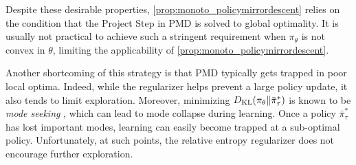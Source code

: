 Despite these desirable properties, 
\cref{prop:monoto_policymirrordescent}
relies on the condition that the Project Step in PMD is solved to
global optimality.
It is usually not practical to achieve such a stringent requirement
when $\pi_\theta$ is not convex in $\theta$,
limiting the applicability of \cref{prop:monoto_policymirrordescent}.

Another shortcoming of this strategy is 
that PMD typically gets trapped in poor local optima.
Indeed, while the regularizer helps prevent
a large policy update, it also tends to limit exploration.
Moreover, minimizing 
$D_{\mathrm{KL}}(\pi_\theta \| \bar{\pi}_\tau^*)$
is known to be \emph{mode seeking} \citep{kevin2012machine},
which can lead to mode collapse during learning.
Once a policy $\bar{\pi}_\tau^*$ has lost important modes,
learning can easily become trapped at a sub-optimal policy.
Unfortunately, at such points,
the relative entropy regularizer does not encourage further exploration.

